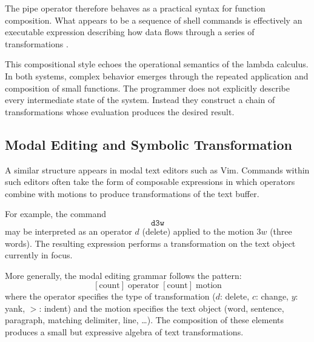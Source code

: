 \documentclass[11pt]{article}
\theoremstyle{definition}
\begin{document}
The pipe operator therefore behaves as a practical syntax for function
composition. What appears to be a sequence of shell commands is
effectively an executable expression describing how data flows through
a series of transformations \cite{fant2006}.

This compositional style echoes the operational semantics of the lambda
calculus. In both systems, complex behavior emerges through the repeated
application and composition of small functions. The programmer does not
explicitly describe every intermediate state of the system. Instead they
construct a chain of transformations whose evaluation produces the
desired result.

\subsection{Modal Editing and Symbolic Transformation}

A similar structure appears in modal text editors such as Vim. Commands
within such editors often take the form of composable expressions in
which operators combine with motions to produce transformations of the
text buffer.

For example, the command
\[
\texttt{d3w}
\]
may be interpreted as an operator $d$ (delete) applied to the motion
$3w$ (three words). The resulting expression performs a transformation
on the text object currently in focus.

More generally, the modal editing grammar follows the pattern:
\[
[\text{count}]\;\text{operator}\;[\text{count}]\;\text{motion}
\]
where the operator specifies the type of transformation ($d$: delete,
$c$: change, $y$: yank, $>$: indent) and the motion specifies the text
object (word, sentence, paragraph, matching delimiter, line, \ldots).
The composition of these elements produces a small but expressive
algebra of text transformations.
\end{document}
